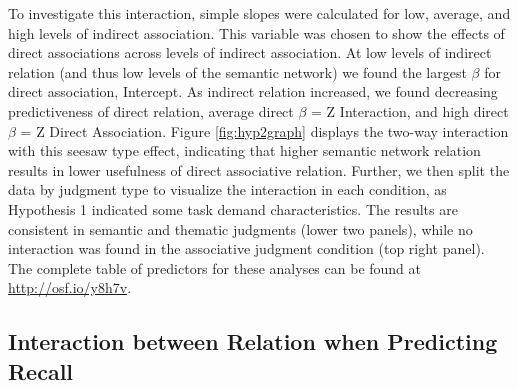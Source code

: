 \documentclass[english,,man]{apa6}
\begin{document}
To investigate this interaction, simple slopes were calculated for low, average, and high levels of indirect association. This variable was chosen to show the effects of direct associations across levels of indirect association. At low levels of indirect relation (and thus low levels of the semantic network) we found the largest \(\beta\) for direct association, Intercept. As indirect relation increased, we found decreasing predictiveness of direct relation, average direct \(\beta\) = Z Interaction, and high direct \(\beta\) = Z Direct Association. Figure \ref{fig:hyp2graph} displays the two-way interaction with this seesaw type effect, indicating that higher semantic network relation results in lower usefulness of direct associative relation. Further, we then split the data by judgment type to visualize the interaction in each condition, as Hypothesis 1 indicated some task demand characteristics. The results are consistent in semantic and thematic judgments (lower two panels), while no interaction was found in the associative judgment condition (top right panel). The complete table of predictors for these analyses can be found at \url{http://osf.io/y8h7v}.

\hypertarget{interaction-between-relation-when-predicting-recall}{%
\subsection{Interaction between Relation when Predicting Recall}\label{interaction-between-relation-when-predicting-recall}}
\end{document}
